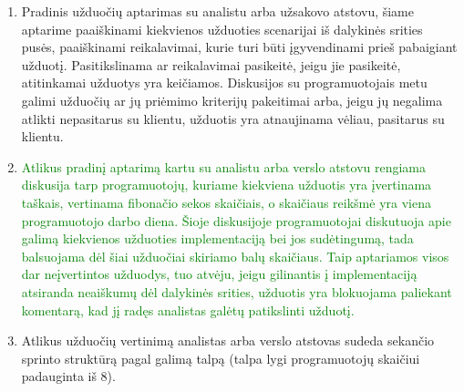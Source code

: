 \documentclass{VUMIFPSkursinis}
\begin{document}
	\begin{enumerate}
		\item{
			Pradinis užduočių aptarimas su analistu arba užsakovo atstovu, šiame aptarime paaiškinami kiekvienos užduoties scenarijai iš dalykinės srities pusės, paaiškinami reikalavimai, kurie turi būti įgyvendinami prieš pabaigiant užduotį.
			Pasitikslinama ar reikalavimai pasikeitė, jeigu jie pasikeitė, atitinkamai užduotys yra keičiamos.
			Diskusijos su programuotojais metu galimi užduočių ar jų priėmimo kriterijų pakeitimai arba, jeigu jų negalima atlikti nepasitarus su klientu, užduotis yra atnaujinama vėliau, pasitarus su klientu.
		}
		\item{
			\textcolor{green}{Atlikus pradinį aptarimą kartu su analistu arba verslo atstovu rengiama diskusija tarp programuotojų, kuriame kiekviena užduotis yra įvertinama taškais, vertinama fibonačio sekos skaičiais, o skaičiaus reikšmė yra viena programuotojo darbo diena.
			Šioje diskusijoje programuotojai diskutuoja apie galimą kiekvienos užduoties implementaciją bei jos sudėtingumą, tada balsuojama dėl šiai užduočiai skiriamo balų skaičiaus.
			Taip aptariamos visos dar neįvertintos užduodys, tuo atvėju, jeigu gilinantis į implementaciją atsiranda neaiškumų dėl dalykinės srities, užduotis yra blokuojama paliekant komentarą, kad jį radęs analistas galėtų patikslinti užduotį.
		}}
		\item{
			Atlikus užduočių vertinimą analistas arba verslo atstovas sudeda sekančio sprinto struktūrą pagal galimą talpą (talpa lygi programuotojų skaičiui padauginta iš 8).
		}
	\end{enumerate}
\end{document}
